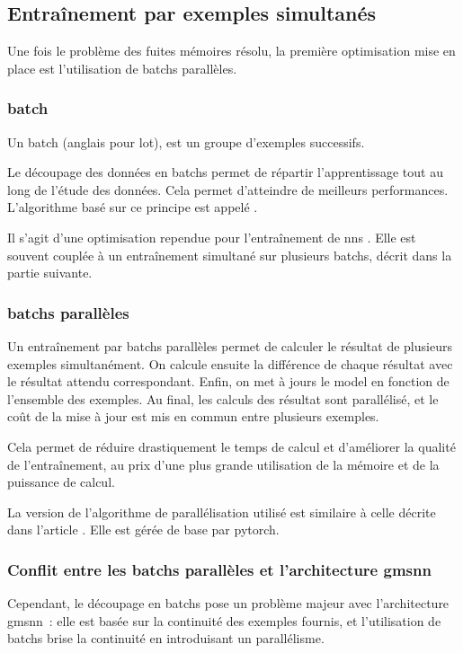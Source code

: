 \subsection{Entraînement par exemples simultanés} \label{subsec:optibatch}
Une fois le problème des fuites mémoires résolu, la première optimisation mise en place est l'utilisation de \glspl{batch} parallèles.

\subsubsection{\Gls{batch}}
Un \gls{batch} (anglais pour lot), est un groupe d'exemples successifs.

Le découpage des données en \glspl{batch} permet de répartir l'apprentissage tout au long de l'étude des données.
Cela permet d'atteindre de meilleurs performances.
L'algorithme basé sur ce principe est appelé  \autocite{batch}.

Il s'agit d'une optimisation rependue pour l'entraînement de \glspl{nn} \autocite{batch}.
Elle est souvent couplée à un entraînement simultané sur plusieurs \glspl{batch}, décrit dans la partie suivante.

\subsubsection{\Glspl{batch} parallèles}
Un entraînement par \glspl{batch} parallèles permet de calculer le résultat de plusieurs exemples simultanément.
On calcule ensuite la différence de chaque résultat avec le résultat attendu correspondant.
Enfin, on met à jours le \gls{model} en fonction de l'ensemble des exemples.
Au final, les calculs des résultat sont parallélisé, et le coût de la mise à jour est mis en commun entre plusieurs exemples.

Cela permet de réduire drastiquement le temps de calcul et d'améliorer la qualité de l'entraînement, au prix d'une plus grande utilisation de la mémoire et de la puissance de calcul.

La version de l'algorithme de parallélisation utilisé est similaire à celle décrite dans l'article \autocite{batch_parallel}. Elle est gérée de base par \gls{pytorch}.

\subsubsection{Conflit entre les \glspl{batch} parallèles et l'architecture \gls{gmsnn}}
Cependant, le découpage en \glspl{batch} pose un problème majeur avec l'architecture \gls{gmsnn}~: elle est basée sur la continuité des exemples fournis, et l'utilisation de \glspl{batch} brise la continuité en introduisant un parallélisme.

